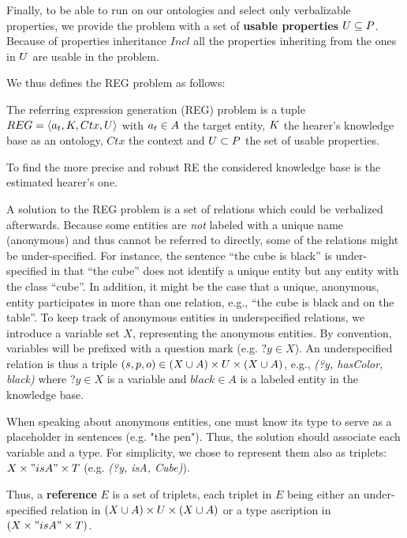 \documentclass[a4paper,11pt,twoside]{StyleThese}
\begin{document}
Finally, to be able to run on our ontologies and select only verbalizable properties, we provide the problem with a set of \textbf{usable properties} $U \subseteq P$. Because of properties inheritance $Incl$ all the properties inheriting from the ones in $U$ are usable in the problem.

We thus defines the REG problem as follows:
\begin{definition}
The referring expression generation (REG) problem is a tuple $REG = \langle a_t, K, Ctx, U \rangle$ with $a_t \in A$ the target entity, $K$ the hearer's knowledge base as an ontology, $Ctx$ the context and $U \subset P$ the set of usable properties.
\end{definition}
To find the more precise and robust RE the considered knowledge base is the estimated hearer's one.


A solution to the REG problem is a set of relations which could be verbalized afterwards.
Because some entities are \textit{not} labeled with a unique name (anonymous) and thus cannot be referred to directly, some of the relations might be under-specified. For instance, the sentence ``the cube is black'' is under-specified in that ``the cube'' does not identify a unique entity but any entity with the class ``cube''.
In addition, it might be the case that a unique, anonymous, entity participates in more than one relation, e.g., ``the cube is black and on the table''. 
To keep track of anonymous entities in underspecified relations, we introduce a variable set $X$, representing the anonymous entities. By convention, variables will be prefixed with a question mark (e.g. $?y \in X$).
An underspecified relation is thus a triple $(s, p, o) \in (X \cup A) \times U \times (X \cup A)$, e.g., \textit{(?y, hasColor, black)} where $?y \in X$ is a variable and $black \in A$ is a labeled entity in the knowledge base.


When speaking about anonymous entities, one must know its type to serve as a placeholder in sentences (e.g. "the pen").
Thus, the solution should associate each variable and a type. For simplicity, we chose to represent them also as triplets: $X \times "isA" \times T$ (e.g. \textit{(?y, isA, Cube)}). 

\begin{definition}[Reference]
\label{def:reference}
Thus, a \textbf{reference} $E$ is a set of triplets, each triplet in $E$ being either an under-specified relation in $(X \cup A) \times U \times (X \cup A)$ or a type ascription in  $(X \times "isA" \times T)$.
\end{definition}
\end{document}
